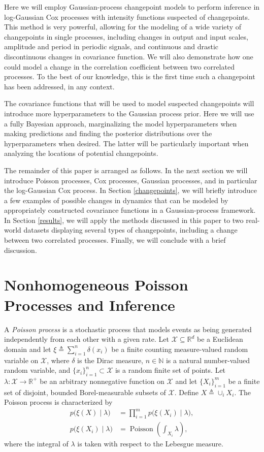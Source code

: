 \documentclass{article}
\newcommand{\deq}{\triangleq}
\newcommand{\cm}[1]{\mathcal{#1}}
\newcommand{\given}{\mid}
\newcommand{\R}{\mathbb{R}}
\newcommand{\N}{\mathbb{N}}
\DeclareMathOperator{\poisson}{Poisson}
\begin{document}
Here we will employ Gaussian-process changepoint models to perform
inference in log-Gaussian Cox processes with intensity functions
suspected of changepoints.  This method is very powerful, allowing for
the modeling of a wide variety of changepoints in single processes,
including changes in output and input scales, amplitude and period in
periodic signals, and continuous and drastic discontinuous changes in
covariance function.  We will also demonstrate how one could model a
change in the correlation coefficient between two correlated
processes.  To the best of our knowledge, this is the first time such
a changepoint has been addressed, in any context.

The covariance functions that will be used to model suspected
changepoints will introduce more hyperparameters to the Gaussian
process prior.  Here we will use a fully Bayesian approach,
marginalizing the model hyperparameters when making predictions and
finding the posterior distributions over the hyperparameters when
desired.  The latter will be particularly important when analyzing the
locations of potential changepoints.

The remainder of this paper is arranged as follows.  In the next
section we will introduce Poisson processes, Cox processes, Gaussian
processes, and in particular the log-Gaussian Cox process.  In Section
\ref{changepoints}, we will briefly introduce a few examples of
possible changes in dynamics that can be modeled by appropriately
constructed covariance functions in a Gaussian-process framework.  In
Section \ref{results}, we will apply the methods discussed in this
paper to two real-world datasets displaying several types of
changepoints, including a change between two correlated processes.
Finally, we will conclude with a brief discussion.

\section{Nonhomogeneous Poisson Processes and Inference}
\label{poisson}

A \emph{Poisson process} is a stochastic process that models events as
being generated independently from each other with a given rate.  Let
$\cm{X} \subseteq \R^d$ be a Euclidean domain and let $\xi \deq
\sum_{i = 1}^n \delta(x_i)$ be a finite counting measure-valued random
variable on $\cm{X}$, where $\delta$ is the Dirac measure, $n \in \N$
is a natural number-valued random variable, and $\lbrace x_i
\rbrace_{i = 1}^n \subset \cm{X}$ is a random finite set of points.
Let $\lambda\colon \cm{X} \to \R^+$ be an arbitrary nonnegative
function on $\cm{X}$ and let $\lbrace X_i \rbrace_{i = 1}^m$ be a
finite set of disjoint, bounded Borel-measurable subsets of $\cm{X}$.
Define $X \deq \cup_i X_i$.  The Poisson process is characterized by
\begin{align}
  p\bigl(\xi(X) \given \lambda \bigr) 
  &= 
  \prod_{i=1}^m p\bigl(\xi(X_i)\given \lambda \bigr),
  \nonumber
  \\
  p\bigl(\xi(X_i) \given \lambda \bigr)
  &=
  \poisson\left( \textstyle \int_{X_i} \lambda \right),
  \label{realprobability}
\end{align}
where the integral of $\lambda$ is taken with respect to the Lebesgue
measure.
\end{document}
